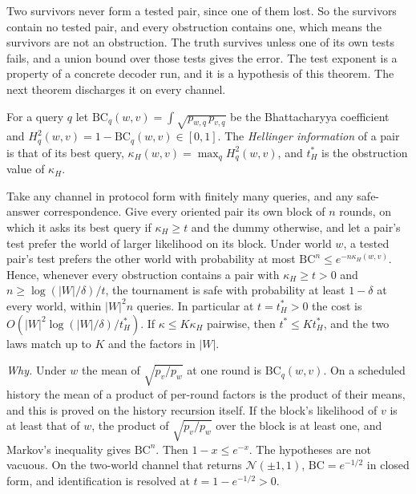 
Two survivors never form a tested pair, since one of them lost. So the survivors contain no
tested pair, and every obstruction contains one, which means the survivors are not an
obstruction. The truth survives unless one of its own tests fails, and a union bound over those
tests gives the error. The test exponent is a property of a concrete decoder run, and it is a
hypothesis of this theorem. The next theorem discharges it on every channel.

For a query $q$ let $\mathrm{BC}_{q}(w,v)=\int\sqrt{p_{w,q}\,p_{v,q}}$ be the Bhattacharyya
coefficient and $H^{2}_{q}(w,v)=1-\mathrm{BC}_{q}(w,v)\in[0,1]$. The \emph{Hellinger
information} of a pair is that of its best query, $\kappa_{H}(w,v)=\max_{q}H^{2}_{q}(w,v)$, and
$t^{*}_{H}$ is the obstruction value of $\kappa_{H}$.

\begin{theorem}
\label{thm:hellupper}
Take any channel in protocol form with finitely many queries, and any safe-answer
correspondence. Give every oriented pair its own block of $n$ rounds, on which it asks its best
query if $\kappa_{H}\ge t$ and the dummy otherwise, and let a pair's test prefer the world of
larger likelihood on its block. Under world $w$, a tested pair's test prefers the other world
with probability at most $\mathrm{BC}^{n}\le e^{-n\kappa_{H}(w,v)}$. Hence, whenever every
obstruction contains a pair with $\kappa_{H}\ge t>0$ and $n\ge\log(|W|/\delta)/t$, the
tournament is safe with probability at least $1-\delta$ at every world, within $|W|^{2}n$
queries. In particular at $t=t^{*}_{H}>0$ the cost is $O(|W|^{2}\log(|W|/\delta)/t^{*}_{H})$.
If $\kappa\le K\kappa_{H}$ pairwise, then $t^{*}\le Kt^{*}_{H}$, and the two laws match up to $K$
and the factors in $|W|$.
\end{theorem}


\emph{Why.} Under $w$ the mean of $\sqrt{p_{v}/p_{w}}$ at one round is $\mathrm{BC}_{q}(w,v)$. On a
scheduled history the mean of a product of per-round factors is the product of their means, and
this is proved on the history recursion itself. If the block's likelihood of $v$ is at least that
of $w$, the product of $\sqrt{p_{v}/p_{w}}$ over the block is at least one, and Markov's
inequality gives $\mathrm{BC}^{n}$. Then $1-x\le e^{-x}$. The hypotheses are not vacuous. On the
two-world channel that returns $\mathcal N(\pm1,1)$, $\mathrm{BC}=e^{-1/2}$ in closed form, and
identification is resolved at $t=1-e^{-1/2}>0$.

